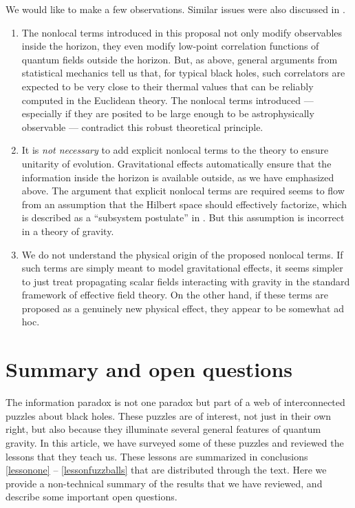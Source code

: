 \documentclass[12pt]{article}
\begin{document}
We would like to make a few observations.  Similar issues were also discussed in \cite{vijaythesis}.
\begin{enumerate}
\item
The nonlocal terms introduced in this proposal not only modify observables inside the horizon, they even modify
low-point correlation functions of quantum fields outside the horizon.  But, as above, general arguments from statistical mechanics tell us that, for typical black holes, such correlators are expected to be very close to their thermal values that can be reliably computed in the Euclidean theory.   The nonlocal terms introduced --- especially if they are posited to be large enough to be astrophysically observable ---  contradict this robust theoretical principle.
\item
It is {\em not necessary} to add  explicit nonlocal terms to the theory to ensure unitarity of evolution.  Gravitational effects automatically ensure that the information inside the horizon is available outside, as we have emphasized above. The argument that explicit nonlocal terms are required seems to flow  from an assumption that the Hilbert space should
effectively factorize, which is described as a ``subsystem postulate'' in \cite{Giddings:2017mym}. But this assumption is incorrect in a theory of gravity.
\item
We do not understand the physical origin of the proposed nonlocal terms. If such terms are simply meant to model gravitational effects, it seems simpler to just treat propagating scalar fields interacting with gravity in the standard framework of effective field theory. On the other hand, if these terms are proposed as a genuinely new physical effect, they appear to be somewhat ad hoc.
\end{enumerate}


\section{Summary and open questions}
The information paradox is not one paradox but part of a web of interconnected puzzles about black holes. These puzzles are of interest, not just
in their own right, but also because they illuminate several general features of quantum gravity. In this article, we have surveyed some of these puzzles and reviewed the lessons that they teach us. These lessons are summarized in conclusions \ref{lessonone} -- \ref{lessonfuzzballs} that are distributed through the text. Here we provide a non-technical summary of the results that we have reviewed, and describe some  important open questions.
\end{document}
